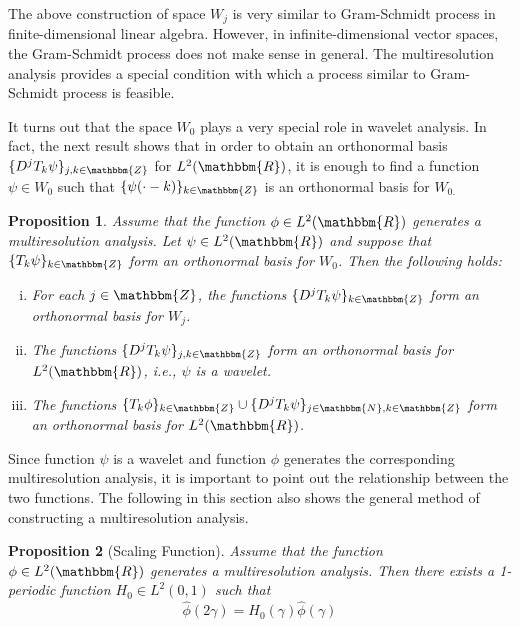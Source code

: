 \documentclass{book}
\newenvironment{enumerateroman}{\begin{enumerate}[i.] }{\end{enumerate}}
\newtheorem{proposition}{Proposition}
\begin{document}
The above construction of space $W_j$ is very similar to Gram-Schmidt process
in finite-dimensional linear algebra. However, in infinite-dimensional vector
spaces, the Gram-Schmidt process does not make sense in general. The
multiresolution analysis provides a special condition with which a process
similar to Gram-Schmidt process is feasible.

It turns out that the space $W_0$ plays a very special role in wavelet
analysis. In fact, the next result shows that in order to obtain an
orthonormal basis $\{ D^j T_k \psi \}_{j, k \in \mathbbm{Z}}$ for $L^2
(\mathbbm{R})$, it is enough to find a function $\psi \in W_0$ such that $\{
\psi (\cdot - k) \}_{k \in \mathbbm{Z}}$ is an orthonormal basis for $W_{0.}$

\begin{proposition}
  Assume that the function $\phi \in L^2 (\mathbbm{R})$ generates a
  multiresolution analysis. Let $\psi \in L^2 (\mathbbm{R})$ and suppose that
  $\{ T_k \psi \}_{k \in \mathbbm{Z}}$ form an orthonormal basis for $W_0$.
  Then the following holds:
  \begin{enumerateroman}
    \item For each $j \in \mathbbm{Z}$, the functions $\{ D^j T_k \psi \}_{k
    \in \mathbbm{Z}}$ form an orthonormal basis for $W_j$.
    
    \item The functions $\{ D^j T_k \psi \}_{j, k \in \mathbbm{Z}}$ form an
    orthonormal basis for $L^2 (\mathbbm{R})$, i.e., $\psi$ is a wavelet.
    
    \item The functions $\{ T_k \phi \}_{k \in \mathbbm{Z}} \cup \{ D^j T_k
    \psi \}_{j \in \mathbbm{N}, k \in \mathbbm{Z}}$ form an orthonormal basis
    for $L^2 (\mathbbm{R})$.{\hspace*{\fill}}
  \end{enumerateroman}
\end{proposition}

Since function $\psi$ is a wavelet and function $\phi$ generates the
corresponding multiresolution analysis, it is important to point out the
relationship between the two functions. The following in this section also
shows the general method of constructing a multiresolution analysis.

\begin{proposition}[Scaling Function]
  Assume that the function $\phi \in L^2 (\mathbbm{R})$ generates a
  multiresolution analysis. Then there exists a 1-periodic function $H_0 \in
  L^2 (0, 1)$ such that
  \begin{equation}
    \hat{\phi} (2 \gamma) = H_0 (\gamma) \hat{\phi} (\gamma)
    \label{scalingEquation}
  \end{equation}
\end{proposition}
\end{document}
